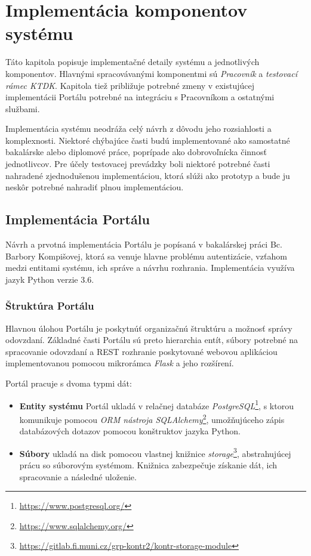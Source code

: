 \documentclass[
  digital, %
  oneside, %
  table,   %
  lof,     %
  lot,   %
]{fithesis3}
\newcommand*{\footurl}[1]{\footnote{\url{#1}}}
\begin{document}
\chapter{Implementácia komponentov systému}

Táto kapitola popisuje implementačné detaily systému a jednotlivých komponentov. Hlavnými spracovávanými komponentmi sú \emph{Pracovník} a \emph{testovací rámec KTDK}. Kapitola tiež približuje potrebné zmeny v existujúcej implementácii Portálu potrebné na integráciu s Pracovníkom a ostatnými službami.

Implementácia systému neodráža celý návrh z dôvodu jeho rozsiahlosti a komplexnosti. Niektoré chýbajúce časti budú implementované ako samostatné bakalárske alebo diplomové práce, poprípade ako dobrovoľnícka činnosť jednotlivcov. Pre účely testovacej prevádzky boli niektoré potrebné časti nahradené zjednodušenou implementáciou, ktorá slúži ako prototyp a bude ju neskôr potrebné nahradiť plnou implementáciou.


\section{Implementácia Portálu}
\label{impl-portal}

Návrh a prvotná implementácia Portálu je popísaná v bakalárskej práci Bc. Barbory Kompišovej, ktorá sa venuje hlavne problému autentizácie, vzťahom medzi entitami systému, ich správe a návrhu rozhrania\cite{kontr-portal}. Implementácia využíva jazyk Python verzie 3.6. 

\subsection{Štruktúra Portálu}

Hlavnou úlohou Portálu je poskytnúť organizačnú štruktúru a možnosť správy odovzdaní. Základné časti Portálu sú preto hierarchia entít, súbory potrebné na spracovanie odovzdaní a REST rozhranie poskytované webovou aplikáciou implementovanou pomocou mikrorámca \emph{Flask} a jeho rozšírení. 

Portál pracuje s dvoma typmi dát:
\begin{itemize}
  \item \textbf{Entity systému} Portál ukladá v relačnej databáze \emph{PostgreSQL}\footnote{\url{https://www.postgresql.org/}}, s ktorou komunikuje pomocou \emph{ORM nástroja SQLAlchemy}\footurl{https://www.sqlalchemy.org/}, umožňujúceho zápis databázových dotazov pomocou konštruktov jazyka Python.
  \item \textbf{Súbory} ukladá na disk pomocou vlastnej knižnice \emph{storage}\footurl{https://gitlab.fi.muni.cz/grp-kontr2/kontr-storage-module}, abstrahujúcej prácu so súborovým systémom. Knižnica zabezpečuje získanie dát, ich spracovanie a následné uloženie.
\end{itemize}
\end{document}
